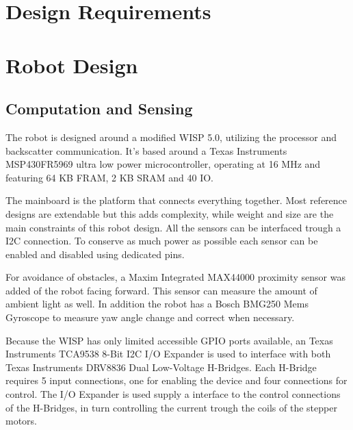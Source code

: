 \documentclass[letterpaper, 10 pt, conference]{ieeeconf}  %
\begin{document}
\section{Design Requirements}




\section{Robot Design}



\subsection{Computation and Sensing}

The robot is designed around a modified WISP 5.0, utilizing the processor and backscatter communication.
It's based around a Texas Instruments MSP430FR5969 ultra low power microcontroller, operating at 16 MHz and featuring 64 KB FRAM, 2 KB SRAM and 40 IO. 


The mainboard is the platform that connects everything together.
Most reference designs are extendable but this adds complexity, while weight and size are the main constraints of this robot design.
All the sensors can be interfaced trough a I2C connection.
To conserve as much power as possible each sensor can be enabled and disabled using dedicated pins.

For avoidance of obstacles, a Maxim Integrated MAX44000 proximity sensor was added of the robot facing forward.
This sensor can measure the amount of ambient light as well.
In addition the robot has a Bosch BMG250 Mems Gyroscope to measure yaw angle change and correct when necessary.


Because the WISP has only limited accessible GPIO ports available, an Texas Instruments TCA9538 8-Bit I2C I/O Expander is used to interface with both Texas Instruments DRV8836 Dual Low-Voltage H-Bridges.	
Each H-Bridge requires 5 input connections, one for enabling the device and four connections for control.
The I/O Expander is used supply a interface to the control connections of the H-Bridges, in turn controlling the current trough the coils of the stepper motors.
\end{document}
